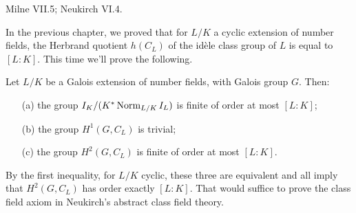 %
%
%
%
%
%
%

Milne VII.5; Neukirch VI.4.

\medskip
In the previous chapter, we proved that for $L/K$ a cyclic extension of number fields,
the Herbrand quotient $h(C_L)$ of the id\`ele class group of $L$ is equal
to $[L:K]$. This time we'll prove the following.
\begin{theorem} \label{T:first and second inequality}
Let $L/K$ be a Galois extension of number fields, with Galois group $G$.
Then:
\begin{enumerate}
\item[(a)] the group $I_K/(K^* \operatorname{Norm}_{L/K} I_L)$ is finite of order at most
$[L:K]$;
\item[(b)] the group $H^1(G, C_L)$ is trivial;
\item[(c)] the group $H^2(G, C_L)$ is finite of order at most $[L:K]$.
\end{enumerate}
\end{theorem}
By the first inequality, for $L/K$ cyclic, these three are equivalent and
all imply that $H^2(G, C_L)$ has order exactly $[L:K]$. That would suffice
to prove the class field axiom in Neukirch's abstract class field theory.

